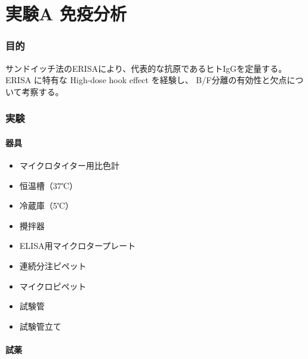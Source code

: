 \documentclass[a4paper]{ltjsarticle}
\begin{document}
\part{実験A 免疫分析}

\section{目的}

サンドイッチ法のERISAにより、代表的な抗原であるヒトIgGを定量する。
ERISA に特有な High-dose hook effect を経験し、
B/F分離の有効性と欠点について考察する。

\section{実験}


\subsection{器具}

\begin{itemize}
    \item マイクロタイター用比色計
    \item 恒温槽（37℃）
    \item 冷蔵庫（5℃）
    \item 攪拌器
    \item ELISA用マイクロタープレート
    \item 連続分注ピペット
    \item マイクロピペット
    \item 試験管
    \item 試験管立て
\end{itemize}

\subsection{試薬}
\end{document}
